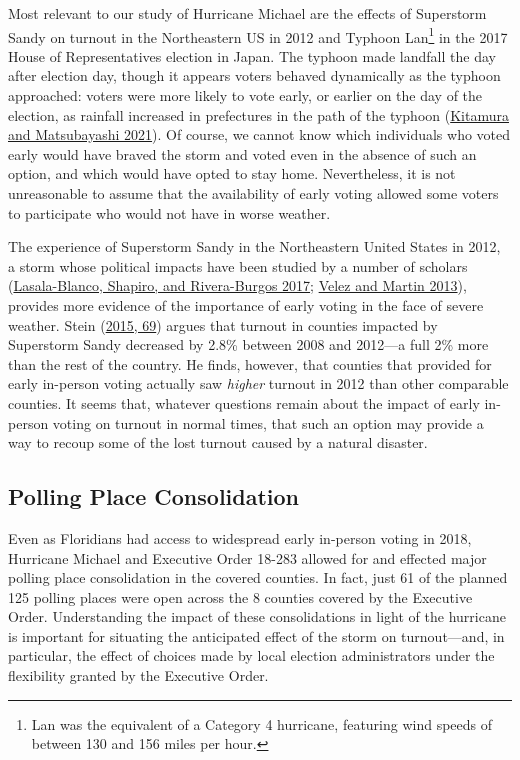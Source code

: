 \documentclass[
  12pt,
]{article}
\begin{document}
Most relevant to our study of Hurricane Michael are the effects of Superstorm Sandy on turnout in the Northeastern US in 2012 and Typhoon Lan\footnote{Lan was the equivalent of a Category 4 hurricane, featuring wind speeds of between 130 and 156 miles per hour.} in the 2017 House of Representatives election in Japan. The typhoon made landfall the day after election day, though it appears voters behaved dynamically as the typhoon approached: voters were more likely to vote early, or earlier on the day of the election, as rainfall increased in prefectures in the path of the typhoon (\protect\hyperlink{ref-Kitamura2021}{Kitamura and Matsubayashi 2021}). Of course, we cannot know which individuals who voted early would have braved the storm and voted even in the absence of such an option, and which would have opted to stay home. Nevertheless, it is not unreasonable to assume that the availability of early voting allowed some voters to participate who would not have in worse weather.

The experience of Superstorm Sandy in the Northeastern United States in 2012, a storm whose political impacts have been studied by a number of scholars (\protect\hyperlink{ref-Lasala-Blanco2017}{Lasala-Blanco, Shapiro, and Rivera-Burgos 2017}; \protect\hyperlink{ref-Velez2013}{Velez and Martin 2013}), provides more evidence of the importance of early voting in the face of severe weather. Stein (\protect\hyperlink{ref-Stein2015}{2015, 69}) argues that turnout in counties impacted by Superstorm Sandy decreased by 2.8\% between 2008 and 2012---a full 2\% more than the rest of the country. He finds, however, that counties that provided for early in-person voting actually saw \emph{higher} turnout in 2012 than other comparable counties. It seems that, whatever questions remain about the impact of early in-person voting on turnout in normal times, that such an option may provide a way to recoup some of the lost turnout caused by a natural disaster.

\hypertarget{polling-place-consolidation}{%
\subsection*{Polling Place Consolidation}\label{polling-place-consolidation}}

Even as Floridians had access to widespread early in-person voting in 2018, Hurricane Michael and Executive Order 18-283 allowed for and effected major polling place consolidation in the covered counties. In fact, just 61 of the planned 125 polling places were open across the 8 counties covered by the Executive Order. Understanding the impact of these consolidations in light of the hurricane is important for situating the anticipated effect of the storm on turnout---and, in particular, the effect of choices made by local election administrators under the flexibility granted by the Executive Order.
\end{document}
